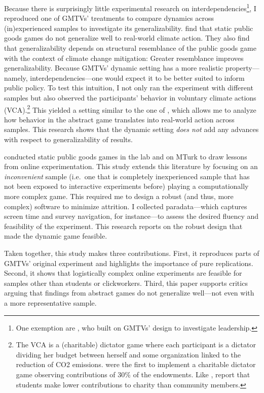 \documentclass[
  authoryear,
  review,
  3p,
  onecolumn]{elsarticle}
\begin{document}
Because there is surprisingly little experimental research on
interdependencies\footnote{One exemption are \citet{Moser2019}, who
  built on GMTVs' design to investigate leadership.}, I reproduced one
of GMTVs' treatments to compare dynamics across (in)experienced samples
to investigate its generalizability. \citet{GKLS2020} find that static
public goods games do not generalize well to real-world climate action.
They also find that generalizability depends on structural resemblance
of the public goods game with the context of climate change mitigation:
Greater resemblance improves generalizability. Because GMTVs' dynamic
setting has a more realistic property---namely, interdependencies---one
would expect it to be better suited to inform public policy. To test
this intuition, I not only ran the experiment with different samples but
also observed the participants' behavior in voluntary climate actions
(VCA).\footnote{The VCA is a (charitable) dictator game where each
  participant is a dictator dividing her budget between herself and some
  organization linked to the reduction of CO2 emissions.
  \citet{EckelGrossman1996} were the first to implement a charitable
  dictator game observing contributions of 30\% of the endowments. Like
  \citet{GKLS2020}, \citet{CarpenterEtAl2008} report that students make
  lower contributions to charity than community members.} This yielded a
setting similar to the one of \citet{GKLS2020}, which allows me to
analyze how behavior in the abstract game translates into real-world
action across samples. This research shows that the dynamic setting
\emph{does not} add any advances with respect to generalizability of
results.

\citet{AGM2018} conducted static public goods games in the lab and on
MTurk to draw lessons from online experimentation. This study extends
this literature \citep[see,
e.g.,][]{SnowbergYariv_2021, GuptaRigottiWilson_2021, GoodmanPaolacci2017, AmirEtAl2012}
by focusing on an \emph{inconvenient} sample (i.e.~one that is
completely inexperienced sample that has not been exposed to interactive
experiments before) playing a computationally more complex game. This
required me to design a robust (and thus, more complex) software to
minimize attrition. I collected paradata---which captures screen time
and survey navigation, for instance---to assess the desired fluency and
feasibility of the experiment. This research reports on the robust
design that made the dynamic game feasible.

Taken together, this study makes three contributions. First, it
reproduces parts of GMTVs' original experiment and highlights the
importance of pure replications. Second, it shows that logistically
complex online experiments are feasible for samples other than students
or clickworkers. Third, this paper supports critics arguing that
findings from abstract games do not generalize well---not even with a
more representative sample.
\end{document}
